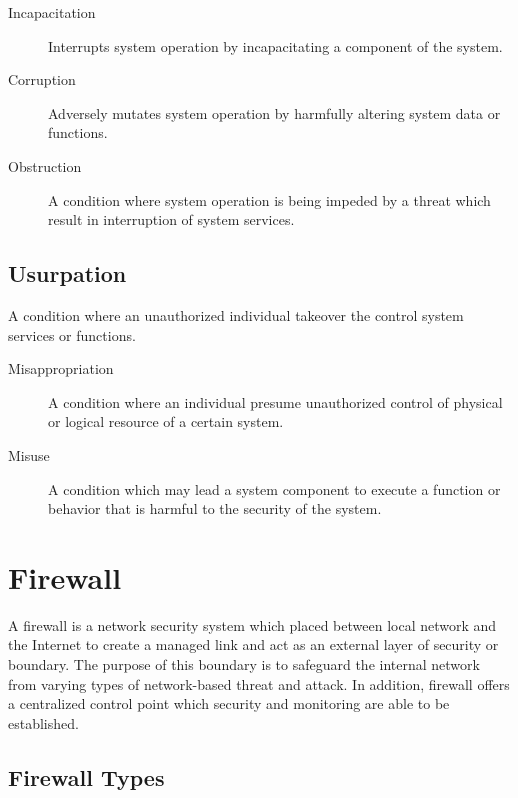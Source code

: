 \documentclass[../index.tex]{subfiles}
\begin{document}
\begin{description}

	\item[Incapacitation] Interrupts system operation by incapacitating a component of the system.

	\item[Corruption] Adversely mutates system operation by harmfully altering system data or
		functions.

	\item[Obstruction] A condition where system operation is being impeded by a threat which result in
		interruption of system services.

\end{description}

\subsection{Usurpation}

A condition where an unauthorized individual takeover the control system services or functions.

\begin{description}

	\item[Misappropriation] A condition where an individual presume unauthorized control of physical
		or logical resource of a certain system.

	\item[Misuse] A condition which may lead a system component to execute a function or behavior that
		is harmful to the security of the system.

\end{description}

\section{Firewall}

A firewall is a network security system which placed between local network and the Internet to
create a managed link and act as an external layer of security or boundary. The purpose of this
boundary is to safeguard the internal network from varying types of network-based threat and attack.
In addition, firewall offers a centralized control point which security and monitoring are able to
be established.

\subsection{Firewall Types}
\end{document}
